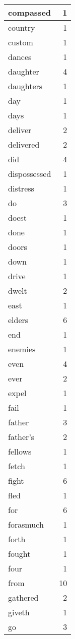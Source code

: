 \begin{center}
\begin{longtable}{l|r}
compassed & 1\\ \hline 
country & 1\\ \hline 
custom & 1\\ \hline 
dances & 1\\ \hline 
daughter & 4\\ \hline 
daughters & 1\\ \hline 
day & 1\\ \hline 
days & 1\\ \hline 
deliver & 2\\ \hline 
delivered & 2\\ \hline 
did & 4\\ \hline 
dispossessed & 1\\ \hline 
distress & 1\\ \hline 
do & 3\\ \hline 
doest & 1\\ \hline 
done & 1\\ \hline 
doors & 1\\ \hline 
down & 1\\ \hline 
drive & 1\\ \hline 
dwelt & 2\\ \hline 
east & 1\\ \hline 
elders & 6\\ \hline 
end & 1\\ \hline 
enemies & 1\\ \hline 
even & 4\\ \hline 
ever & 2\\ \hline 
expel & 1\\ \hline 
fail & 1\\ \hline 
father & 3\\ \hline 
father's & 2\\ \hline 
fellows & 1\\ \hline 
fetch & 1\\ \hline 
fight & 6\\ \hline 
fled & 1\\ \hline 
for & 6\\ \hline 
forasmuch & 1\\ \hline 
forth & 1\\ \hline 
fought & 1\\ \hline 
four & 1\\ \hline 
from & 10\\ \hline 
gathered & 2\\ \hline 
giveth & 1\\ \hline 
go & 3\\ \hline 

\end{longtable}
\end{center}
